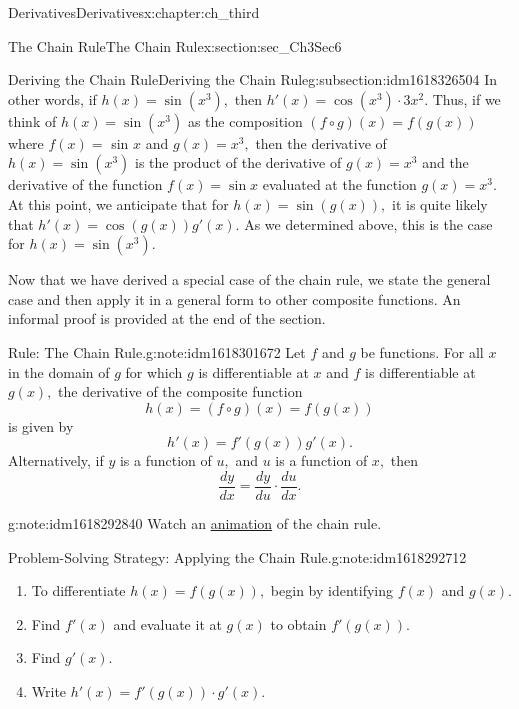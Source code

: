 \documentclass[oneside,10pt,]{book}
\numberwithin{equation}{section}
\begin{document}
\begin{chapterptx}{Derivatives}{}{Derivatives}{}{}{x:chapter:ch_third}
\begin{sectionptx}{The Chain Rule}{}{The Chain Rule}{}{}{x:section:sec_Ch3Sec6}
\begin{subsectionptx}{Deriving the Chain Rule}{}{Deriving the Chain Rule}{}{}{g:subsection:idm1618326504}
In other words, if \(h(x)=\sin (x^3),\) then \(h'(x)=\cos (x^3)\cdot 3x^2.\) Thus, if we think of \(h(x)=\sin(x^3)\) as the composition \((f\circ g)(x)=f(g(x))\) where \(f(x)=\) sin \(x\) and \(g(x)=x^3,\) then the derivative of \(h(x)=\sin(x^3)\) is the product of the derivative of \(g(x)=x^3\) and the derivative of the function \(f(x)=\sin x\) evaluated at the function \(g(x)=x^3.\) At this point, we anticipate that for \(h(x)=\sin (g(x)),\) it is quite likely that \(h'(x)=\cos(g(x))g'(x).\) As we determined above, this is the case for \(h(x)=\sin (x^3).\)%
\par
Now that we have derived a special case of the chain rule, we state the general case and then apply it in a general form to other composite functions. An informal proof is provided at the end of the section.%
\begin{note}{Rule: The Chain Rule.}{g:note:idm1618301672}%
Let \(f\) and \(g\) be functions. For all \(x\) in the domain of \(g\) for which \(g\) is differentiable at \(x\) and \(f\) is differentiable at \(g(x),\) the derivative of the composite function%
%
\begin{equation*}
h(x)=(f\circ g)(x)=f(g(x))
\end{equation*}
is given by%
%
\begin{equation*}
h'(x)=f'(g(x))g'(x).
\end{equation*}
Alternatively, if \(y\) is a function of \(u,\) and \(u\) is a function of \(x,\) then%
%
\begin{equation*}
\frac{dy}{dx}=\frac{dy}{du}\cdot \frac{du}{dx}.
\end{equation*}
\end{note}
\begin{note}{}{g:note:idm1618292840}%
Watch an \href{http://www.openstax.org/l/20_chainrule2}{animation}\footnotemark{} of the chain rule.%
\end{note}
%
\begin{note}{Problem-Solving Strategy: Applying the Chain Rule.}{g:note:idm1618292712}%
%
\begin{enumerate}
\item{}To differentiate \(h(x)=f(g(x)),\) begin by identifying \(f(x)\) and \(g(x).\)%
\item{}Find \(f'(x)\) and evaluate it at \(g(x)\) to obtain \(f'(g(x)).\)%
\item{}Find \(g'(x).\)%
\item{}Write \(h'(x)=f'(g(x))\cdot g'(x).\)%

\end{enumerate}
\end{note}
\end{subsectionptx}
\end{sectionptx}
\end{chapterptx}
\end{document}
